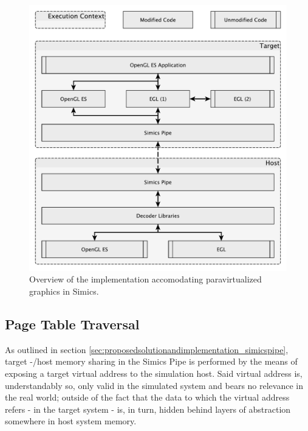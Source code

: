 \begin{figure}
\centering
\includegraphics[width=\linewidth]{img/yedoverview.pdf}
\caption[Paravirtualization implementation overview]{Overview of the implementation accomodating paravirtualized graphics in Simics.}
\label{fig:overview}
\end{figure}


\subsection{Page Table Traversal}
\label{sec:proposedsolutionandimplementation_pagetabletraversal}
As outlined in section \ref{sec:proposedsolutionandimplementation_simicspipe}, target -/host memory sharing in the Simics Pipe is performed by the means of exposing a target virtual address to the simulation host.
Said virtual address is, understandably so, only valid in the simulated system and bears no relevance in the real world; outside of the fact that the data to which the virtual address refers - in the target system - is, in turn, hidden behind layers of abstraction somewhere in host system memory.

